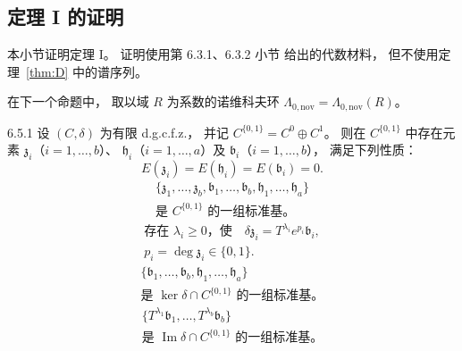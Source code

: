 
\subsection{定理 I 的证明}
\label{subsec:6-5-2}

本小节证明定理 I。
证明使用第 6.3.1、6.3.2 小节
给出的代数材料，
但不使用定理~\ref{thm:D} 中的谱序列。

在下一个命题中，
取以域 $R$ 为系数的诺维科夫环
$\Lambda_{0,\mathrm{nov}}
=\Lambda_{0,\mathrm{nov}}(R)$。

\begin{proposition}{6.5.1}\label{prop:6-5-1}
设 $(C,\delta)$ 为有限 d.g.c.f.z.，
并记 $C^{\{0,1\}}=C^0\oplus C^1$。
则在 $C^{\{0,1\}}$ 中存在元素
$\mathfrak z_i$（$i=1,\ldots,b$）、
$\mathfrak h_i$（$i=1,\ldots,a$）及
$\mathfrak b_i$（$i=1,\ldots,b$），
满足下列性质：
\begin{equation}
E(\mathfrak z_i)
=E(\mathfrak h_i)
=E(\mathfrak b_i)=0.
\tag{6.5.2.1}\label{eq:6-5-2-1}
\end{equation}
\begin{equation}
\begin{gathered}
\{\mathfrak z_1,\ldots,\mathfrak z_b,
\mathfrak b_1,\ldots,\mathfrak b_b,
\mathfrak h_1,\ldots,\mathfrak h_a\}\\
\text{是 }C^{\{0,1\}}\text{ 的一组标准基。}
\end{gathered}
\tag{6.5.2.2}\label{eq:6-5-2-2}
\end{equation}
\begin{equation}
\begin{gathered}
\text{存在 }\lambda_i\ge0\text{，使}
\quad\delta\mathfrak z_i
=T^{\lambda_i}e^{p_i}\mathfrak b_i,\\
p_i=\deg\mathfrak z_i\in\{0,1\}.
\end{gathered}
\tag{6.5.2.3}\label{eq:6-5-2-3}
\end{equation}
\begin{equation}
\begin{gathered}
\{\mathfrak b_1,\ldots,\mathfrak b_b,
\mathfrak h_1,\ldots,\mathfrak h_a\}\\
\text{是 }\ker\delta\cap C^{\{0,1\}}
\text{ 的一组标准基。}
\end{gathered}
\tag{6.5.2.4}\label{eq:6-5-2-4}
\end{equation}
\begin{equation}
\begin{gathered}
\{T^{\lambda_1}\mathfrak b_1,
\ldots,T^{\lambda_b}\mathfrak b_b\}\\
\text{是 }\operatorname{Im}\delta\cap C^{\{0,1\}}
\text{ 的一组标准基。}
\end{gathered}
\tag{6.5.2.5}\label{eq:6-5-2-5}
\end{equation}
\end{proposition}

